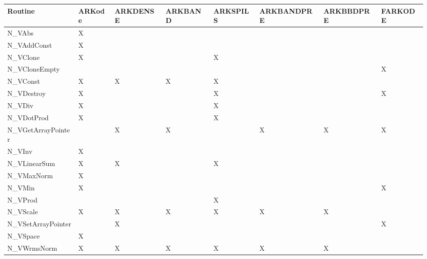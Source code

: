 \documentclass[letterpaper,10pt,english]{sphinxmanual}
\begin{document}
\begin{tabulary}{\linewidth}{|L|L|L|L|L|L|L|L|}
\hline
\textbf{\relax 
Routine
} & \textbf{\relax 
ARKode
} & \textbf{\relax 
ARKDENSE
} & \textbf{\relax 
ARKBAND
} & \textbf{\relax 
ARKSPILS
} & \textbf{\relax 
ARKBANDPRE
} & \textbf{\relax 
ARKBBDPRE
} & \textbf{\relax 
FARKODE
}\\\hline

N\_VAbs
 & 
X
 &  &  &  &  &  & \\\hline

N\_VAddConst
 & 
X
 &  &  &  &  &  & \\\hline

N\_VClone
 & 
X
 &  &  & 
X
 &  &  & \\\hline

N\_VCloneEmpty
 &  &  &  &  &  &  & 
X
\\\hline

N\_VConst
 & 
X
 & 
X
 & 
X
 & 
X
 &  &  & \\\hline

N\_VDestroy
 & 
X
 &  &  & 
X
 &  &  & 
X
\\\hline

N\_VDiv
 & 
X
 &  &  & 
X
 &  &  & \\\hline

N\_VDotProd
 & 
X
 &  &  & 
X
 &  &  & \\\hline

N\_VGetArrayPointer
 &  & 
X
 & 
X
 &  & 
X
 & 
X
 & 
X
\\\hline

N\_VInv
 & 
X
 &  &  &  &  &  & \\\hline

N\_VLinearSum
 & 
X
 & 
X
 &  & 
X
 &  &  & \\\hline

N\_VMaxNorm
 & 
X
 &  &  &  &  &  & \\\hline

N\_VMin
 & 
X
 &  &  &  &  &  & 
X
\\\hline

N\_VProd
 &  &  &  & 
X
 &  &  & \\\hline

N\_VScale
 & 
X
 & 
X
 & 
X
 & 
X
 & 
X
 & 
X
 & \\\hline

N\_VSetArrayPointer
 &  & 
X
 &  &  &  &  & 
X
\\\hline

N\_VSpace
 & 
X
 &  &  &  &  &  & \\\hline

N\_VWrmsNorm
 & 
X
 & 
X
 & 
X
 & 
X
 & 
X
 & 
X
 & \\\hline
\end{tabulary}
\end{document}
